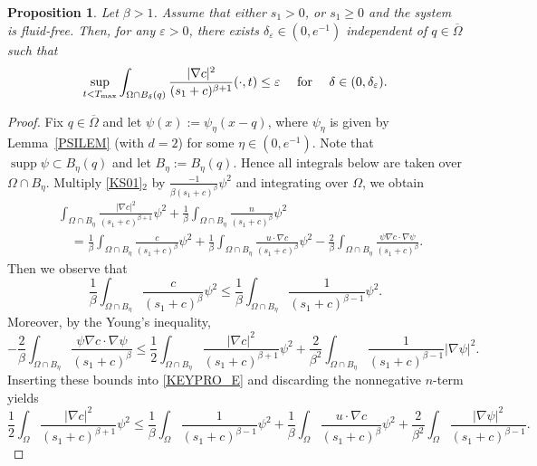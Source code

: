 \documentclass{amsart}
\newtheorem{proposition}[defn]{Proposition}
\numberwithin{equation}{section}
\newcommand{\bket}[1]{\left\{ #1 \right\}}
\DeclareMathOperator{\supp}{supp}
\begin{document}
 
 
 
\begin{proposition}\label{KEYPRO}   Let $\beta>1$. Assume that either $s_{1}>0$, or $s_{1}\ge0$ and the system is fluid-free. Then, for any $\varepsilon>0$, there exists $\delta_{\varepsilon}\in(0, e^{-1})$ independent of $q\in\overline{\Omega}$ such that
\[
\sup_{t<T_{\rm max}}\int_{\Omega\cap B_{\delta}(q)}\frac{|\nabla c|^{2}}{(s_{1}+c)^{\beta+1}} (\cdot,t)\le \varepsilon\quad\mbox{ for }\quad \delta\in(0,\delta_{\varepsilon}).
\]
\end{proposition}

\begin{proof}
Fix $q\in\overline{\Omega}$ and let $\psi(x):=\psi_\eta(x-q)$, where $\psi_\eta$ is given by Lemma~\ref{PSILEM} (with $d=2$) for some $\eta\in(0,e^{-1})$.
Note that $\supp\psi\subset B_\eta(q)$ and let $B_{\eta}:= B_{\eta}(q)$. Hence all integrals below are taken over $\Omega\cap B_\eta$.
Multiply \eqref{KS01}$_2$ by $\frac{-1}{\beta(s_{1}+c)^{\beta}} \psi^2$ and integrating over $\Omega$, we obtain 
	\begin{equation}\label{KEYPRO_E}
	\begin{aligned}
	   & \int_{\Omega \cap B_{\eta}} \frac{|\nabla c|^2}{(s_{1}+c)^{\beta+1}} \psi^2 
		       + \frac{1}{\beta}\int_{\Omega \cap B_{\eta}}\frac{n}{(s_{1}+c)^{\beta}} \psi^2\\
		       &\quad = \frac{1}{\beta}\int_{\Omega \cap B_{\eta}}\frac{c}{(s_{1}+c)^{\beta}} \psi^2 
		       + \frac{1}{\beta}\int_{\Omega \cap B_{\eta}}\frac{u \cdot \nabla c}{(s_{1}+c)^{\beta  }} \psi^2
		       - \frac{2}{\beta}\int_{\Omega \cap B_{\eta}} \frac{\psi \nabla c \cdot \nabla \psi}{(s_{1}+c)^{\beta}}. 
	\end{aligned}
	\end{equation}
Then we observe that 
	\[
	\frac{1}{\beta}\int_{\Omega \cap B_{\eta}}\frac{c}{(s_{1}+c)^{\beta}} \psi^2 \leq \frac{1}{\beta}\int_{\Omega \cap B_{\eta}}  \frac{1}{(s_{1}+c)^{\beta-1}}\psi^2.
	\]
Moreover, by the Young's inequality,
	\[
	- \frac{2}{\beta}\int_{\Omega \cap B_{\eta}} \frac{\psi \nabla c \cdot \nabla \psi}{(s_{1}+c)^{\beta}} \leq \frac{1}{2}\int_{\Omega \cap B_{\eta}}\frac{|\nabla c|^2}{(s_{1}+c)^{\beta+1}} \psi^2 + \frac{2}{\beta^2}\int_{\Omega \cap B_{\eta}}\frac{1}{(s_{1}+c)^{\beta-1}} |\nabla \psi|^2.
	\]
Inserting these bounds into \eqref{KEYPRO_E} and discarding the nonnegative $n$-term yields
\begin{equation}\label{KEYPRO_E1}
\frac12\int_{\Omega}\frac{|\nabla c|^2}{(s_1+c)^{\beta+1}}\psi^2
\le \frac{1}{\beta}\int_{\Omega}\frac{1}{(s_1+c)^{\beta-1}}\psi^2
+\frac{1}{\beta}\int_{\Omega}\frac{u\cdot\nabla c}{(s_1+c)^{\beta}}\psi^2
+\frac{2}{\beta^2}\int_{\Omega}\frac{|\nabla\psi|^2}{(s_1+c)^{\beta-1}}.
\end{equation}


\end{proof}
\end{document}
